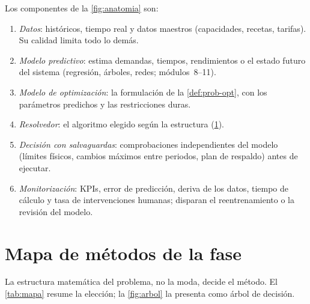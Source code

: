Los componentes de la \cref{fig:anatomia} son:
\begin{enumerate}[label=\arabic*.]
  \item \emph{Datos}: históricos, tiempo real y datos maestros (capacidades, recetas, tarifas). Su calidad limita todo lo demás.
  \item \emph{Modelo predictivo}: estima demandas, tiempos, rendimientos o el estado futuro del sistema (regresión, árboles, redes; módulos~8--11).
  \item \emph{Modelo de optimización}: la formulación de la \cref{def:prob-opt}, con los parámetros predichos y las restricciones duras.
  \item \emph{Resolvedor}: el algoritmo elegido según la estructura (\cref{sec:mapa}).
  \item \emph{Decisión con salvaguardas}: comprobaciones independientes del modelo (límites físicos, cambios máximos entre periodos, plan de respaldo) antes de ejecutar.
  \item \emph{Monitorización}: KPIs, error de predicción, deriva de los datos, tiempo de cálculo y tasa de intervenciones humanas; disparan el reentrenamiento o la revisión del modelo.
\end{enumerate}

\addtocounter{definicion}{1}%

\section{Mapa de métodos de la fase}\label{sec:mapa}

La estructura matemática del problema, no la moda, decide el método. El \cref{tab:mapa} resume la elección; la \cref{fig:arbol} la presenta como árbol de decisión.


